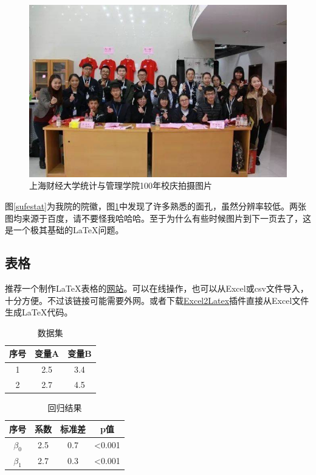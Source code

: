 \documentclass[UTF8,a4paper,10.5pt]{ctexart}
\begin{document}
\begin{figure}[h]
	\centering\includegraphics[scale=0.4]{sufe100.jpg}
	\caption{上海财经大学统计与管理学院100年校庆拍摄图片}
	\label{sufe100}
\end{figure}
	
图\ref{sufestat}为我院的院徽，图\ref{sufe100}中发现了许多熟悉的面孔，虽然分辨率较低。两张图均来源于百度，请不要怪我哈哈哈。至于为什么有些时候图片到下一页去了，这是一个极其基础的LaTeX问题。

\subsection{表格}
推荐一个制作LaTeX表格的\href{https://www.tablesgenerator.com/}{网站}。可以在线操作，也可以从Excel或csv文件导入，十分方便。不过该链接可能需要外网。或者下载\href{https://ctan.org/tex-archive/support/excel2latex/}{Excel2Latex}插件直接从Excel文件生成LaTeX代码。

\begin{table}[h]
	\caption{数据集}
	\centering\begin{tabular}{c|c|c}
		\hline
		序号 & 变量A & 变量B \\ 
		\hline
		1 & 2.5 & 3.4 \\ 
		\hline
		2 & 2.7 & 4.5 \\ 
		\hline
	\end{tabular}
	\label{dataset}
\end{table}

\begin{table}[h]
	\caption{回归结果}
	\centering\begin{tabular}{c|c|c|c}
		\hline
		序号 & 系数 & 标准差 & p值 \\ 
		\hline
		$\beta_0$ & 2.5 & 0.7 & <0.001 \\ 
		\hline
		$\beta_1$ & 2.7 & 0.3 & <0.001 \\ 
		\hline
	\end{tabular}
	\label{outcome}
\end{table}
\end{document}
